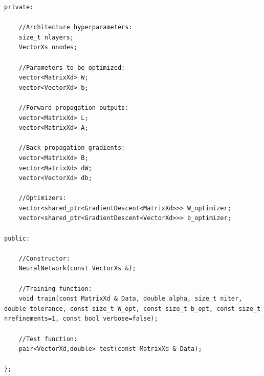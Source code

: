 \documentclass[12pt, a4paper]{report}
\theoremstyle{definition}
\begin{document}
{\begin{lstlisting}[frame=single, name=neuralnet, showstringspaces=false]
private:

	//Architecture hyperparameters:
	size_t nlayers;
	VectorXs nnodes;		

	//Parameters to be optimized:
	vector<MatrixXd> W;	
	vector<VectorXd> b;		

	//Forward propagation outputs:
	vector<MatrixXd> L; 	
	vector<MatrixXd> A;		

	//Back propagation gradients:
	vector<MatrixXd> B;		
	vector<MatrixXd> dW;
	vector<VectorXd> db;

	//Optimizers:
	vector<shared_ptr<GradientDescent<MatrixXd>>> W_optimizer;
	vector<shared_ptr<GradientDescent<VectorXd>>> b_optimizer;

public:

	//Constructor:
	NeuralNetwork(const VectorXs &);
	
	//Training function:
	void train(const MatrixXd & Data, double alpha, size_t niter, double tolerance, const size_t W_opt, const size_t b_opt, const size_t nrefinements=1, const bool verbose=false);
	
	//Test function:
	pair<VectorXd,double> test(const MatrixXd & Data);
	
};


\end{lstlisting}}
\end{document}
